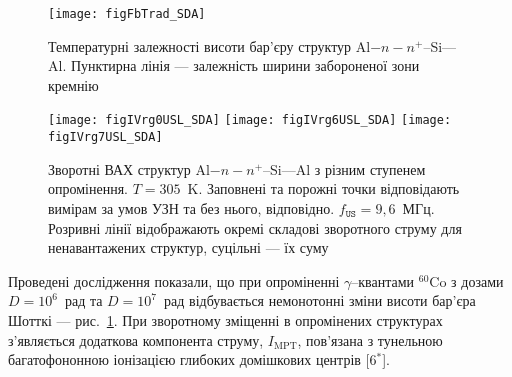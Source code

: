 \begin{figure}
\center
\texttt{[image: figFbTrad\_SDA]}
\caption{\label{figFbTrad_SDA}
Температурні залежності висоти бар'єру структур Al$-n-n^+$--Si---Al.
Пунктирна лінія --- залежність ширини забороненої зони кремнію
}%
\end{figure}



\begin{figure}[b]
\center
\texttt{[image: figIVrg0USL\_SDA]}\hfill
\texttt{[image: figIVrg6USL\_SDA]}\hfill
\texttt{[image: figIVrg7USL\_SDA]}
\caption{\label{figIVrg0USL_SDA}
Зворотні  ВАХ  структур Al$-n-n^+$--Si---Al з різним ступенем опромінення.
$T=305$~K.
Заповнені та порожні точки відповідають вимірам за умов УЗН та без нього, відповідно.
$f_\mathtt{US}=9,6$~МГц.
Розривні лінії відображають окремі складові зворотного струму для ненавантажених структур,
суцільні --- їх суму
}%
\end{figure}

Проведені дослідження показали, що при
опроміненні $\gamma$--квантами $^{60}$Co з дозами $D\!=\!10^6$~рад та $D\!=\!10^7$~рад відбувається
немонотонні зміни висоти бар'єра Шотткі --- рис.~\ref{figFbTrad_SDA}.
При зворотному зміщенні в опромінених структурах з'являється додаткова компонента струму, $I_\mathrm{MPT}$,
пов'язана з тунельною багатофононною іонізацією глибоких домішкових центрів
[6$^*$].

